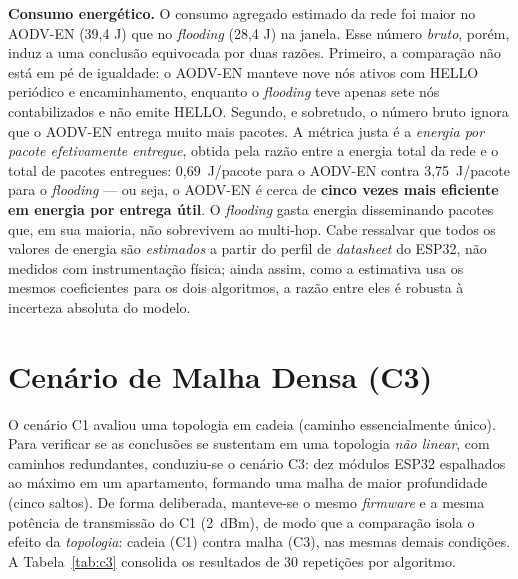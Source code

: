 \textbf{Consumo energético.} O consumo agregado estimado da rede foi
maior no AODV-EN (39,4 J) que no \emph{flooding} (28,4 J) na janela. Esse
número \emph{bruto}, porém, induz a uma conclusão equivocada por duas razões.
Primeiro, a comparação não está em pé de igualdade: o AODV-EN manteve nove nós
ativos com HELLO periódico e encaminhamento, enquanto o \emph{flooding} teve
apenas sete nós contabilizados e não emite HELLO. Segundo, e sobretudo, o
número bruto ignora que o AODV-EN entrega muito mais pacotes. A métrica justa é
a \emph{energia por pacote efetivamente entregue}, obtida pela razão entre a
energia total da rede e o total de pacotes entregues: 0,69~J/pacote para o
AODV-EN contra 3,75~J/pacote para o \emph{flooding} --- ou seja, o AODV-EN é
cerca de \textbf{cinco vezes mais eficiente em energia por entrega útil}. O
\emph{flooding} gasta energia disseminando pacotes que, em sua maioria, não
sobrevivem ao multi-hop. Cabe
ressalvar que todos os valores de energia são \emph{estimados} a partir do
perfil de \emph{datasheet} do ESP32, não medidos com instrumentação física;
ainda assim, como a estimativa usa os mesmos coeficientes para os dois
algoritmos, a razão entre eles é robusta à incerteza absoluta do modelo.

\section{Cenário de Malha Densa (C3)}\label{cenario-de-malha-densa-c3}

O cenário C1 avaliou uma topologia em cadeia (caminho essencialmente
único). Para verificar se as conclusões se sustentam em uma topologia
\emph{não linear}, com caminhos redundantes, conduziu-se o cenário C3: dez
módulos ESP32 espalhados ao máximo em um apartamento, formando uma malha de
maior profundidade (cinco saltos). De forma deliberada, manteve-se o mesmo
\emph{firmware} e a mesma potência de transmissão do C1 (2~dBm), de modo que
a comparação isola o efeito da \emph{topologia}: cadeia (C1) contra malha
(C3), nas mesmas demais condições. A Tabela~\ref{tab:c3} consolida os
resultados de 30 repetições por algoritmo.

